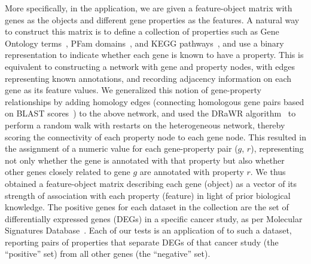 More specifically, in the \msig application, we are given a feature-object matrix with genes as the objects and different gene properties as the features. A natural way to construct this matrix is to define a collection of properties such as Gene Ontology terms~\cite{gene2014gene}, PFam domains~\cite{finn2015pfam}, and KEGG pathways~\cite{kanehisa2016kegg}, and use a binary representation to indicate whether each gene is known to have a property. This is equivalent to constructing a network with gene and property nodes, with edges representing known annotations, and recording adjacency information on each gene as its feature values. We generalized this notion of gene-property relationships by adding homology edges (connecting homologous gene pairs based on BLAST scores~\cite{altschul1990basic}) to the above network, and used the DRaWR algorithm~\cite{blatti2016characterizing} to perform a random walk with restarts on the heterogeneous network, thereby scoring the connectivity of each property node to each gene node. This resulted in the assignment of a numeric value for each gene-property pair ($g$, $r$), representing not only whether the gene is annotated with that property but also whether other genes closely related to gene $g$ are annotated with property $r$. We thus obtained a feature-object matrix describing each gene (object) as a vector of its strength of association with each property (feature) in light of prior biological knowledge.
 The positive genes for each dataset in the \msig collection are the set of differentially expressed genes (DEGs) in a specific cancer study, as per Molecular Signatures Database~\cite{subramanian2005gene}. Each of our tests is an application of \genviz to such a dataset, reporting pairs of properties that separate DEGs of that cancer study (the ``positive'' set) from all other genes (the ``negative'' set).

